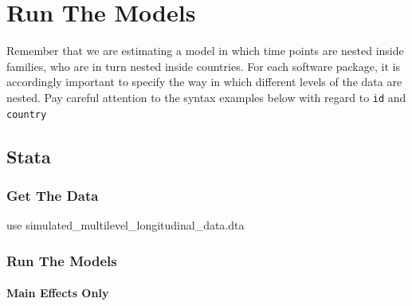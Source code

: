 \documentclass[
  letterpaper,
  DIV=11,
  numbers=noendperiod]{scrreprt}
\let\oldparagraph\paragraph
\renewcommand{\paragraph}[1]{\oldparagraph{#1}\mbox{}}
\newenvironment{Shaded}{\begin{snugshade}}{\end{snugshade}}
\newcommand{\KeywordTok}[1]{\textcolor[rgb]{0.00,0.23,0.31}{#1}}
\newcommand{\NormalTok}[1]{\textcolor[rgb]{0.00,0.23,0.31}{#1}}
\begin{document}
\section{Run The Models}\label{run-the-models-1}

\begin{tcolorbox}[enhanced jigsaw, toptitle=1mm, title=\textcolor{quarto-callout-warning-color}{\faExclamationTriangle}\hspace{0.5em}{Warning}, arc=.35mm, colbacktitle=quarto-callout-warning-color!10!white, left=2mm, breakable, toprule=.15mm, colback=white, opacityback=0, colframe=quarto-callout-warning-color-frame, leftrule=.75mm, opacitybacktitle=0.6, bottomtitle=1mm, titlerule=0mm, rightrule=.15mm, coltitle=black, bottomrule=.15mm]

Remember that we are estimating a model in which time points are nested
inside families, who are in turn nested inside countries. For each
software package, it is accordingly important to specify the way in
which different levels of the data are nested. Pay careful attention to
the syntax examples below with regard to \texttt{id} and
\texttt{country}

\end{tcolorbox}

\subsection{Stata}

\subsubsection{Get The Data}\label{get-the-data-3}

\begin{Shaded}
\begin{Highlighting}[]

\KeywordTok{use}\NormalTok{ simulated\_multilevel\_longitudinal\_data.dta}
\end{Highlighting}
\end{Shaded}

\subsubsection{Run The Models}\label{run-the-models-2}

\paragraph{Main Effects Only}\label{main-effects-only}
\end{document}
